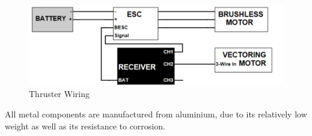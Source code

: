 \documentclass[../main.tex]{subfiles}
\begin{document}
\begin{figure}[H]
	\centering
	\includegraphics[width=.8\linewidth]{img/design/thruster/thrusterWiringSchematic.png}
	\caption{Thruster Wiring}
	\label{fig:thrusterWiringSchematic}
\end{figure}

All metal components are manufactured from aluminium, due to its relatively low weight as well as its resistance to corrosion.
\end{document}
